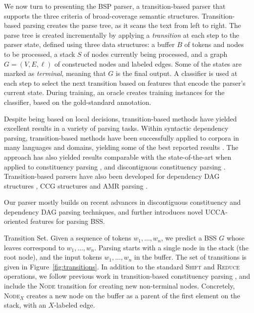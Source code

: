 \documentclass[11pt]{article}
\makeatletter
\newcommand{\figref}[1]{Figure~\ref{#1}}
\renewcommand{\paragraph}{
  \@startsection{paragraph}{4}
  {\z@}{.5ex \@plus .5ex \@minus .2ex}{-1em}
  {\normalfont\normalsize\bfseries}
}
\makeatother
\begin{document}
We now turn to presenting the BSP parser,
a transition-based parser that supports the three criteria of broad-coverage
semantic structures.
Transition-based parsing \cite{Nivre03anefficient} creates the parse tree,
as it scans the text from left to right.
The parse tree is created incrementally by applying a \textit{transition} at each step to the parser state,
defined using three data structures: a buffer $B$ of tokens and nodes to be processed,
a stack $S$ of nodes currently being processed,
and a graph $G=(V,E,\ell)$ of constructed nodes and labeled edges.
Some of the states are marked as \textit{terminal}, meaning that $G$ is the final output.
A classifier is used at each step to select the next transition based on features
that encode the parser's current state.
During training, an oracle creates training instances for the classifier,
based on the gold-standard annotation.

Despite being based on local decisions, transition-based methods have yielded excellent
results in a variety of parsing tasks.
Within syntactic dependency parsing, transition-based methods
have been successfully applied to corpora in many languages and domains, yielding some
of the best reported results \cite{dyer2015transition,ballesteros2015improved}. 
The approach has also yielded results comparable with the state-of-the-art when applied
to constituency parsing \cite{sagae2005classifier,zhang2009transition,zhu2013fast},
and discontiguous constituency parsing \cite{maier2015discontinuous}.
Transition-based parsers have also been developed for dependency DAG structures
\cite{sagae2008shift,tokgoz2015transition}, CCG structures \cite{ambati2015incremental}
and AMR parsing \cite{wang2015transition}.

Our parser mostly builds on recent advances in discontiguous constituency
and dependency DAG parsing techniques, and further introduces novel UCCA-oriented features for parsing BSS.

\paragraph{Transition Set.}
Given a sequence of tokens $w_1, \ldots, w_n$, we predict a BSS $G$ whose leaves
correspond to  $w_1, \ldots, w_n$.
Parsing starts with a single node in the stack (the root node), and the input tokens
$w_1, \ldots, w_n$ in the buffer. The set of transitions is given in \figref{fig:transitions}.
In addition to the standard \textsc{Shift} and \textsc{Reduce} operations, 
we follow previous work in transition-based constituency parsing \cite{sagae2005classifier}, and include the \textsc{Node} transition for creating new non-terminal nodes.
Concretely, \textsc{Node$_X$} creates a new node on the buffer as a parent of the first element on the stack, with an $X$-labeled edge.
\end{document}
